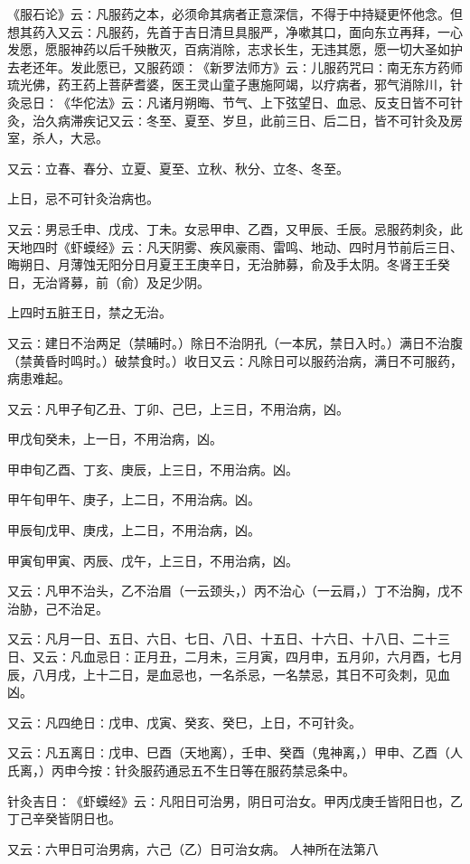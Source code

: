 \documentclass[a4paper,12pt,UTF8,twoside]{ctexbook}
\begin{document}
《服石论》云∶凡服药之本，必须命其病者正意深信，不得于中持疑更怀他念。但想其药入又云∶凡服药，先首于吉日清旦具服严，净嗽其口，面向东立再拜，一心发愿，愿服神药以后千殃散灭，百病消除，志求长生，无违其愿，愿一切大圣如护去老还年。发此愿已，又服药颂∶《新罗法师方》云∶儿服药咒曰∶南无东方药师琉光佛，药王药上菩萨耆婆，医王灵山童子惠施阿竭，以疗病者，邪气消除川，针灸忌日∶《华佗法》云∶凡诸月朔晦、节气、上下弦望日、血忌、反支日皆不可针灸，治久病滞疾记又云∶冬至、夏至、岁旦，此前三日、后二日，皆不可针灸及房室，杀人，大忌。

又云∶立春、春分、立夏、夏至、立秋、秋分、立冬、冬至。

上日，忌不可针灸治病也。

又云∶男忌壬申、戊戌、丁未。女忌甲申、乙酉，又甲辰、壬辰。忌服药刺灸，此天地四时《虾蟆经》云∶凡天阴雾、疾风豪雨、雷鸣、地动、四时月节前后三日、晦朔日、月薄蚀无阳分日月夏王王庚辛日，无治肺募，俞及手太阴。冬肾王壬癸日，无治肾募，前（俞）及足少阴。

上四时五脏王日，禁之无治。

又云∶建日不治两足（禁晡时。）除日不治阴孔（一本尻，禁日入时。）满日不治腹（禁黄昏时鸣时。）破禁食时。）收日又云∶凡除日可以服药治病，满日不可服药，病患难起。

又云∶凡甲子旬乙丑、丁卯、己巳，上三日，不用治病，凶。

甲戊旬癸未，上一日，不用治病，凶。

甲申旬乙酉、丁亥、庚辰，上三日，不用治病。凶。

甲午旬甲午、庚子，上二日，不用治病。凶。

甲辰旬戊甲、庚戌，上二日，不用治病，凶。

甲寅旬甲寅、丙辰、戊午，上三日，不用治病，凶。

又云∶凡甲不治头，乙不治眉（一云颈头，）丙不治心（一云肩，）丁不治胸，戊不治胁，己不治足。

又云∶凡月一日、五日、六日、七日、八日、十五日、十六日、十八日、二十三日、又云∶凡血忌日∶正月丑，二月未，三月寅，四月申，五月卯，六月酉，七月辰，八月戌，上十二日，是血忌也，一名杀忌，一名禁忌，其日不可灸刺，见血凶。

又云∶凡四绝日∶戊申、戊寅、癸亥、癸巳，上日，不可针灸。

又云∶凡五离日∶戊申、巳酉（天地离），壬申、癸酉（鬼神离，）甲申、乙酉（人氏离，）丙申今按∶针灸服药通忌五不生日等在服药禁忌条中。

针灸吉日∶《虾蟆经》云∶凡阳日可治男，阴日可治女。甲丙戊庚壬皆阳日也，乙丁己辛癸皆阴日也。

又云∶六甲日可治男病，六己（乙）日可治女病。
人神所在法第八
\end{document}

